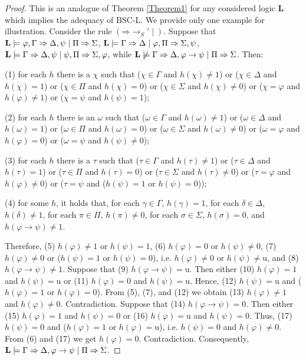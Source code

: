 \documentclass[11pt,a4paper,titlepage]{article}
\theoremstyle{definition}
\newcommand{\3}{\vspace{.3in}}
\newcommand{\2}{\vspace{.2in}}
\newcommand{\1}{\vspace{.1in}}
\newcommand{\5}{\vspace{.05in}}
\begin{document}
\begin{proof}
This is an analogue of Theorem \ref{Theorem1} for any considered logic {\bf L} which implies the adequacy of BSC-L. We provide only one example for illustration. Consider the rule $(\mathord{\Rightarrow}\mathord{\rightarrow_S'\mid})$. Suppose that $ {\bf L}\models \varphi,\Gamma\Rightarrow\Delta,\psi\mid\Pi\Rightarrow\Sigma$, $ {\bf L}\models \Gamma\Rightarrow\Delta\mid\varphi,\Pi\Rightarrow\Sigma,\psi$, $ {\bf L}\models \Gamma\Rightarrow\Delta,\psi\mid\psi,\Pi\Rightarrow\Sigma,\varphi$, while $ {\bf L}\not\models \Gamma\Rightarrow\Delta,\varphi\rightarrow\psi\mid\Pi\Rightarrow\Sigma$. Then: 

(1) for each $ h $ there is a $ \chi $ such that ($ \chi\in\Gamma $ and $ h(\chi)\not=1 $) or ($ \chi\in\Delta $ and $ h(\chi)=1 $) or ($ \chi\in\Pi $ and $ h(\chi)=0$) or ($ \chi\in\Sigma $ and $ h(\chi)\not=0 $) or ($ \chi=\varphi $ and $ h(\varphi)\not=1 $) or ($ \chi=\psi $ and $ h(\psi)=1 $); 

(2) for each $ h $ there is an $ \omega $ such that ($ \omega\in\Gamma $ and $ h(\omega)\not=1 $) or ($ \omega\in\Delta $ and $ h(\omega)=1 $) or ($ \omega\in\Pi $ and $ h(\omega)=0$) or ($ \omega\in\Sigma $ and $ h(\omega)\not=0 $) or ($ \omega=\varphi $ and $ h(\varphi)=0 $) or ($ \omega=\psi $ and $ h(\psi)\not=0 $); 

(3) for each $ h $ there is a $ \tau $ such that ($ \tau\in\Gamma $ and $ h(\tau)\not=1 $) or ($ \tau\in\Delta $ and $ h(\tau)=1 $) or ($ \tau\in\Pi $ and $ h(\tau)=0$) or ($ \tau\in\Sigma $ and $ h(\tau)\not=0 $) or ($ \tau=\varphi $ and $ h(\varphi)\not=0 $) or ($ \tau=\psi $ and ($ h(\psi)=1 $ or $ h(\psi)=0 $)); 

(4) for some $ h $, it holds that, for each $ \gamma\in\Gamma $, $h(\gamma)=1$, for each $ \delta\in\Delta $, $ h(\delta)\not=1 $, for each $ \pi\in\Pi $, $ h(\pi)\not=0 $, for each $ \sigma\in\Sigma $, $ h(\sigma)=0 $, and $ h(\varphi\rightarrow\psi)\not=1 $.

Therefore, (5) $ h(\varphi)\not=1 $ or $ h(\psi)=1 $, (6) $ h(\varphi)=0 $ or $ h(\psi)\not=0 $, (7) $ h(\varphi)\not=0 $ or ($ h(\psi)=1 $ or $ h(\psi)=0 $), i.e. $ h(\varphi)\not=0 $ or $ h(\psi)\not=\mathrm{u} $, and (8) $ h(\varphi\rightarrow\psi)\not=1 $. Suppose that (9) $ h(\varphi\rightarrow\psi)=\mathrm{u} $. Then either (10) $ h(\varphi)=1 $ and $ h(\psi)=\mathrm{u} $ or (11) $ h(\varphi)=0 $ and $ h(\psi)=\mathrm{u} $. Hence, (12) $ h(\psi)=\mathrm{u} $ and ($ h(\varphi)=1 $ or $ h(\varphi)=0 $). From (5), (7), and (12) we obtain (13) $ h(\varphi)\not=1 $ and $ h(\varphi)\not=0 $. Contradiction. Suppose that (14) $ h(\varphi\rightarrow\psi)=0$. Then either (15) $ h(\varphi)=1 $ and $ h(\psi)=0 $ or (16) $ h(\varphi)=\mathrm{u} $ and $ h(\psi)=0 $. Thus, (17) $ h(\psi)=0 $ and ($ h(\varphi)=1 $ or $ h(\varphi)=\mathrm{u} $), i.e. $ h(\psi)=0 $ and $ h(\varphi)\not=0 $. From (6) and (17) we get $ h(\varphi)=0 $. Contradiction. Consequently, $ {\bf L}\models \Gamma\Rightarrow\Delta,\varphi\rightarrow\psi\mid\Pi\Rightarrow\Sigma$.


\end{proof}
\end{document}
